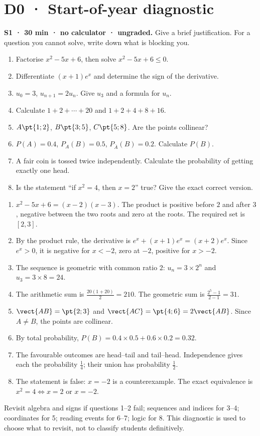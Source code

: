 \mxnewpage\chapter*{D0 · Start-of-year diagnostic}
\textbf{S1 · 30 min · no calculator · ungraded.} Give a brief justification. For a question you cannot solve, write down what is blocking you.
\begin{enumerate}
\item Factorise $x^2-5x+6$, then solve $x^2-5x+6\le0$.
\item Differentiate $(x+1)e^x$ and determine the sign of the derivative.
\item $u_0=3$, $u_{n+1}=2u_n$. Give $u_3$ and a formula for $u_n$.
\item Calculate $1+2+\cdots+20$ and $1+2+4+8+16$.
\item $A\pt{1;2}$, $B\pt{3;5}$, $C\pt{5;8}$. Are the points collinear?
\item $P(A)=\num{0,4}$, $P_A(B)=\num{0,5}$, $P_{\overline A}(B)=\num{0,2}$. Calculate $P(B)$.
\item A fair coin is tossed twice independently. Calculate the probability of getting exactly one head.
\item Is the statement ``if $x^2=4$, then $x=2$'' true? Give the exact correct version.
\end{enumerate}
\ifmxteacher\begin{teachernote}
\begin{enumerate}
\item $x^2-5x+6=(x-2)(x-3)$. The product is positive before $2$ and after $3$, negative between the two roots and zero at the roots. The required set is $[2,3]$.
\item By the product rule, the derivative is $e^x+(x+1)e^x=(x+2)e^x$. Since $e^x>0$, it is negative for $x<-2$, zero at $-2$, positive for $x>-2$.
\item The sequence is geometric with common ratio $2$: $u_n=3\times2^n$ and $u_3=3\times8=24$.
\item The arithmetic sum is $\frac{20(1+20)}{2}=210$. The geometric sum is $\frac{2^5-1}{2-1}=31$.
\item $\vect{AB}=\pt{2;3}$ and $\vect{AC}=\pt{4;6}=2\vect{AB}$. Since $A\ne B$, the points are collinear.
\item By total probability, $P(B)=\num{0,4}\times\num{0,5}+\num{0,6}\times\num{0,2}=\num{0,32}$.
\item The favourable outcomes are head--tail and tail--head. Independence gives each the probability $\frac{1}{4}$; their union has probability $\frac{1}{2}$.
\item The statement is false: $x=-2$ is a counterexample. The exact equivalence is $x^2=4\Longleftrightarrow x=2\text{ or }x=-2$.
\end{enumerate}
Revisit algebra and signs if questions 1--2 fail; sequences and indices for 3--4; coordinates for 5; reading events for 6--7; logic for 8. This diagnostic is used to choose what to revisit, not to classify students definitively.
\end{teachernote}\fi
\mainmatter


